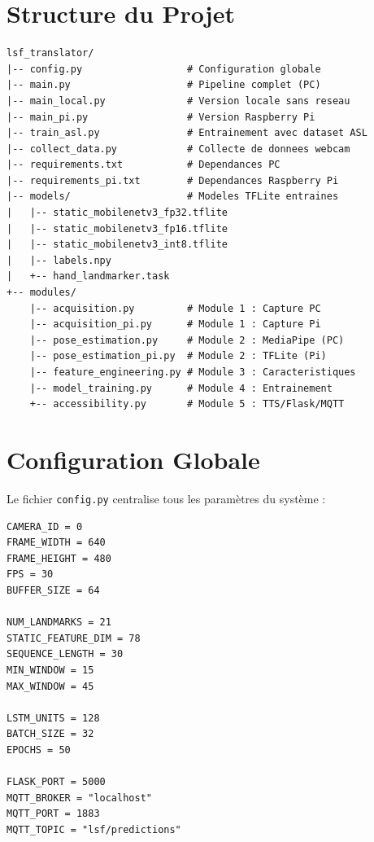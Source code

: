 \section{Structure du Projet}

\begin{lstlisting}[style=python, caption={Arborescence du projet}]
lsf_translator/
|-- config.py                  # Configuration globale
|-- main.py                    # Pipeline complet (PC)
|-- main_local.py              # Version locale sans reseau
|-- main_pi.py                 # Version Raspberry Pi
|-- train_asl.py               # Entrainement avec dataset ASL
|-- collect_data.py            # Collecte de donnees webcam
|-- requirements.txt           # Dependances PC
|-- requirements_pi.txt        # Dependances Raspberry Pi
|-- models/                    # Modeles TFLite entraines
|   |-- static_mobilenetv3_fp32.tflite
|   |-- static_mobilenetv3_fp16.tflite
|   |-- static_mobilenetv3_int8.tflite
|   |-- labels.npy
|   +-- hand_landmarker.task
+-- modules/
    |-- acquisition.py         # Module 1 : Capture PC
    |-- acquisition_pi.py      # Module 1 : Capture Pi
    |-- pose_estimation.py     # Module 2 : MediaPipe (PC)
    |-- pose_estimation_pi.py  # Module 2 : TFLite (Pi)
    |-- feature_engineering.py # Module 3 : Caracteristiques
    |-- model_training.py      # Module 4 : Entrainement
    +-- accessibility.py       # Module 5 : TTS/Flask/MQTT
\end{lstlisting}

\section{Configuration Globale}

Le fichier \texttt{config.py} centralise tous les paramètres du système :

\begin{lstlisting}[style=python, caption={Paramètres de configuration}]
CAMERA_ID = 0
FRAME_WIDTH = 640
FRAME_HEIGHT = 480
FPS = 30
BUFFER_SIZE = 64

NUM_LANDMARKS = 21
STATIC_FEATURE_DIM = 78
SEQUENCE_LENGTH = 30
MIN_WINDOW = 15
MAX_WINDOW = 45

LSTM_UNITS = 128
BATCH_SIZE = 32
EPOCHS = 50

FLASK_PORT = 5000
MQTT_BROKER = "localhost"
MQTT_PORT = 1883
MQTT_TOPIC = "lsf/predictions"
\end{lstlisting}
